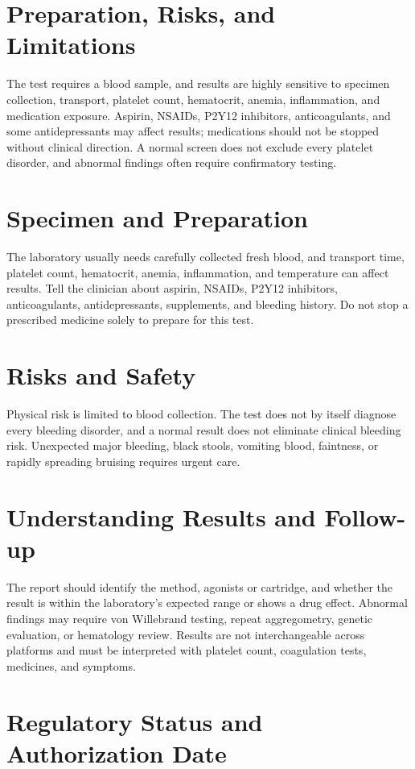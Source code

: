 \section*{Preparation, Risks, and Limitations}
The test requires a blood sample, and results are highly sensitive to specimen collection, transport, platelet count, hematocrit, anemia, inflammation, and medication exposure. Aspirin, NSAIDs, P2Y12 inhibitors, anticoagulants, and some antidepressants may affect results; medications should not be stopped without clinical direction. A normal screen does not exclude every platelet disorder, and abnormal findings often require confirmatory testing.
\section*{Specimen and Preparation}
The laboratory usually needs carefully collected fresh blood, and transport time, platelet count, hematocrit, anemia, inflammation, and temperature can affect results. Tell the clinician about aspirin, NSAIDs, P2Y12 inhibitors, anticoagulants, antidepressants, supplements, and bleeding history. Do not stop a prescribed medicine solely to prepare for this test.

\section*{Risks and Safety}
Physical risk is limited to blood collection. The test does not by itself diagnose every bleeding disorder, and a normal result does not eliminate clinical bleeding risk. Unexpected major bleeding, black stools, vomiting blood, faintness, or rapidly spreading bruising requires urgent care.

\section*{Understanding Results and Follow-up}
The report should identify the method, agonists or cartridge, and whether the result is within the laboratory's expected range or shows a drug effect. Abnormal findings may require von Willebrand testing, repeat aggregometry, genetic evaluation, or hematology review. Results are not interchangeable across platforms and must be interpreted with platelet count, coagulation tests, medicines, and symptoms.

\section*{Regulatory Status and Authorization Date}

\clearpage
